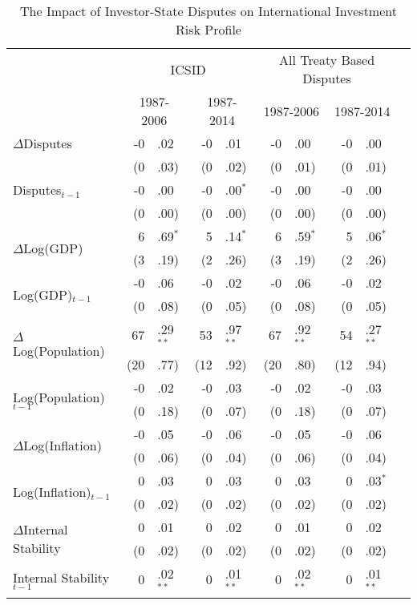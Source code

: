 \documentclass[12pt,onesided]{amsart}
\begin{document}
\begin{table}[ht]
\vspace{1cm}
\centering
{\footnotesize
\caption{The Impact of Investor-State Disputes on International Investment Risk Profile}
\label{tab:ecm}
\begin{tabular}{lr@{} lr@{}lr@{}lr@{}lr@{}}
	\hline\hline
	~ & \multicolumn{4}{c}{ICSID} & \multicolumn{4}{c}{All Treaty Based Disputes} \\
	~ & \multicolumn{2}{c}{1987-2006} & \multicolumn{2}{c}{1987-2014} & \multicolumn{2}{c}{1987-2006} & \multicolumn{2}{c}{1987-2014} \\
	\hline
  $\Delta$Disputes & -0&.02 & -0&.01 & -0&.00 & -0&.00 \\
~ & (0&.03) & (0&.02) & (0&.01) & (0&.01) \\
  Disputes$_{t-1}$ & -0&.00 & -0&.00$^{\ast}$ & -0&.00 & -0&.00 \\
  ~ & (0&.00) &  (0&.00) & (0&.00) & (0&.00) \\
  \multirow{2}{*}{$\Delta$Log(GDP)} & 6&.69$^{\ast}$ & 5&.14$^{\ast}$ & 6&.59$^{\ast}$ & 5&.06$^{\ast}$ \\
  & (3&.19) & (2&.26) & (3&.19) & (2&.26) \\
  \multirow{2}{*}{Log(GDP)$_{t-1}$} & -0&.06 & -0&.02 & -0&.06 & -0&.02\\
  & (0&.08) & (0&.05) & (0&.08) & (0&.05) \\
  \multirow{2}{*}{$\Delta$Log(Population)} & 67&.29$^{\ast\ast}$ & 53&.97$^{\ast\ast}$ & 67&.92$^{\ast\ast}$ & 54&.27$^{\ast\ast}$ \\
  & (20&.77) & (12&.92) & (20&.80) & (12&.94)\\
  \multirow{2}{*}{Log(Population)$_{t-1}$} & -0&.02 & -0&.03 & -0&.02 & -0&.03 \\
  & (0&.18) & (0&.07) & (0&.18) & (0&.07) \\
  \multirow{2}{*}{$\Delta$Log(Inflation)} & -0&.05 &  -0&.06 &  -0&.05 &  -0&.06 \\
  & (0&.06) &  (0&.04) &  (0&.06) &  (0&.04) \\
  \multirow{2}{*}{Log(Inflation)$_{t-1}$} & 0&.03 &  0&.03 &  0&.03 &  0&.03$^{\ast}$ \\
  & (0&.02) &  (0&.02) &  (0&.02) &  (0&.02) \\
  \multirow{2}{*}{$\Delta$Internal Stability} & 0&.01 & 0&.02 &  0&.01 &  0&.02 \\
  & (0&.02) &  (0&.02) &  (0&.02) &  (0&.02) \\
  \multirow{2}{*}{Internal Stability$_{t-1}$} & 0&.02$^{\ast\ast}$ &  0&.01$^{\ast\ast}$ &  0&.02$^{\ast\ast}$ &  0&.01$^{\ast\ast}$ \\

\end{tabular}}
\end{table}
\end{document}
